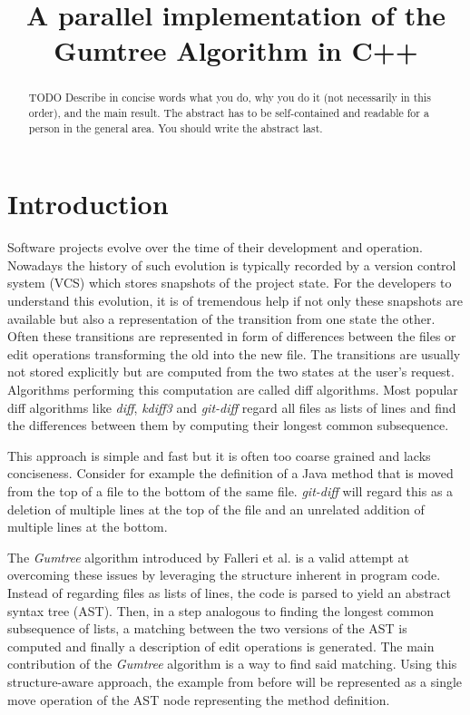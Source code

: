 \documentclass[letterpaper]{article}
\title{A parallel implementation of the Gumtree Algorithm in C++}
\begin{document}
%
\maketitle
%

\begin{abstract}
TODO Describe in concise words what you do, why you do it (not necessarily
in this order), and the main result.  The abstract has to be
self-contained and readable for a person in the general area. You
should write the abstract last.
\end{abstract}

\section{Introduction}\label{sec:intro}


Software projects evolve over the time of their development and operation.
Nowadays the history of such evolution is typically recorded by a version control system (VCS) which stores snapshots of the project state.
For the developers to understand this evolution, it is of tremendous help if not only these snapshots are available but also a representation of the transition from one state the other.
Often these transitions are represented in form of differences between the files or edit operations transforming the old into the new file.
The transitions are usually not stored explicitly but are computed from the two states at the user's request.
Algorithms performing this computation are called diff algorithms.
Most popular diff algorithms like \emph{diff}, \emph{kdiff3} and \emph{git-diff} regard all files as lists of lines and find the differences between them by computing their longest common subsequence.

This approach is simple and fast but it is often too coarse grained and lacks conciseness.
Consider for example the definition of a Java method that is moved from the top of a file to the bottom of the same file.
\emph{git-diff} will regard this as a deletion of multiple lines at the top of the file and an unrelated addition of multiple lines at the bottom.

The \emph{Gumtree} algorithm introduced by Falleri et al. \cite{falleri:2014:structure_diff} is a valid attempt at overcoming these issues by leveraging the structure inherent in program code.
Instead of regarding files as lists of lines, the code is parsed to yield an abstract syntax tree (AST).
Then, in a step analogous to finding the longest common subsequence of lists, a matching between the two versions of the AST is computed and finally a description of edit operations is generated.
The main contribution of the \emph{Gumtree} algorithm is a way to find said matching.
Using this structure-aware approach, the example from before will be represented as a single move operation of the AST node representing the method definition.
\end{document}
